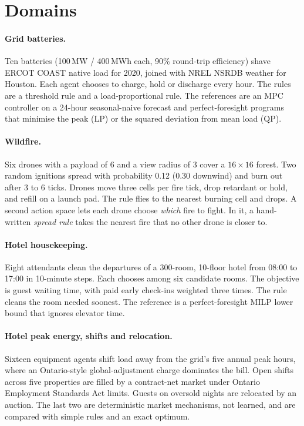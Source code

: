 \documentclass[11pt]{article}
\begin{document}
\section{Domains}

\paragraph{Grid batteries.} Ten batteries (100\,MW / 400\,MWh each, 90\% round-trip efficiency) shave ERCOT COAST native load for 2020, joined with NREL NSRDB weather for Houston. Each agent chooses to charge, hold or discharge every hour. The rules are a threshold rule and a load-proportional rule. The references are an MPC controller on a 24-hour seasonal-naive forecast and perfect-foresight programs that minimise the peak (LP) or the squared deviation from mean load (QP).

\paragraph{Wildfire.} Six drones with a payload of 6 and a view radius of 3 cover a $16\times16$ forest. Two random ignitions spread with probability 0.12 (0.30 downwind) and burn out after 3 to 6 ticks. Drones move three cells per fire tick, drop retardant or hold, and refill on a launch pad. The rule flies to the nearest burning cell and drops. A second action space lets each drone choose \emph{which} fire to fight. In it, a hand-written \emph{spread rule} takes the nearest fire that no other drone is closer to.

\paragraph{Hotel housekeeping.} Eight attendants clean the departures of a 300-room, 10-floor hotel from 08:00 to 17:00 in 10-minute steps. Each chooses among six candidate rooms. The objective is guest waiting time, with paid early check-ins weighted three times. The rule cleans the room needed soonest. The reference is a perfect-foresight MILP lower bound that ignores elevator time.

\paragraph{Hotel peak energy, shifts and relocation.} Sixteen equipment agents shift load away from the grid's five annual peak hours, where an Ontario-style global-adjustment charge dominates the bill. Open shifts across five properties are filled by a contract-net market under Ontario Employment Standards Act limits. Guests on oversold nights are relocated by an auction. The last two are deterministic market mechanisms, not learned, and are compared with simple rules and an exact optimum.
\end{document}
